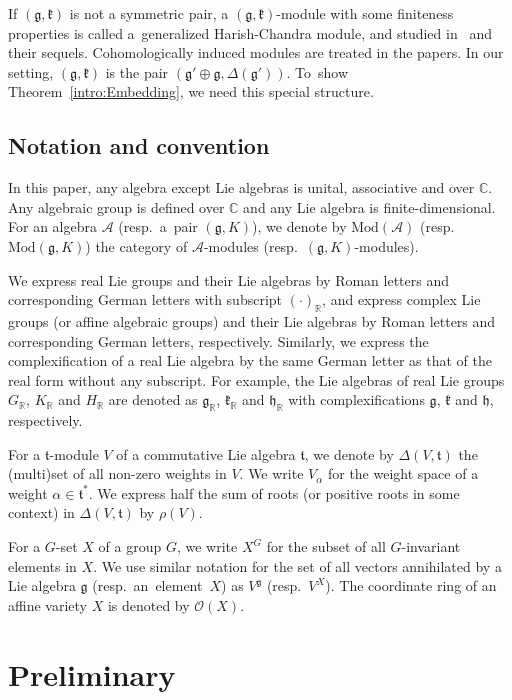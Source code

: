 \documentclass[pdftex]{sigma}
\numberwithin{equation}{section}
\theoremstyle{definition}
\newcommand{\BasicRing}[1]{\mathbb{#1}}
\newcommand{\RR}{\BasicRing{R}}
\newcommand{\CC}{\BasicRing{C}}
\newcommand{\Mod}{\mathrm{Mod}}
\newcommand{\alg}[1]{\mathcal{#1}}
\newcommand{\lie}[1]{\mathfrak{#1}}
\newcommand{\regular}{\mathcal{O}}
\newcommand{\rring}[1]{\regular(#1)}
\newcommand{\rhog}[1]{\rho(#1)}
\begin{document}
If $(\lie{g}, \lie{k})$ is not a symmetric pair, a $(\lie{g}, \lie{k})$-module with some finiteness properties is called a~generalized Harish-Chandra module, and studied in~\cite{PeZu04_generalized_harish_chandra,PeZu04_generalized_harish_chandra2} and their sequels.
Cohomologically induced modules are treated in the papers.
In our setting, $(\lie{g}, \lie{k})$ is the pair $(\lie{g'\oplus g}, \Delta(\lie{g'}))$.
To~show Theorem~\ref{intro:Embedding}, we need this special structure.

\subsection*{Notation and convention}

In this paper, any algebra except Lie algebras is unital, associative and over $\CC$.
Any algebraic group is defined over $\CC$ and any Lie algebra is finite-dimensional.
For an algebra $\alg{A}$ (resp.\ a~pair $(\lie{g}, K)$), we denote by $\Mod(\alg{A})$ (resp.\ $\Mod(\lie{g}, K)$) the category of $\alg{A}$-modules (resp.\ \mbox{$(\lie{g}, K)$-modules}).

We express real Lie groups and their Lie algebras by Roman letters and corresponding German letters with subscript $(\cdot)_\RR$, and express complex Lie groups (or affine algebraic groups) and their Lie algebras by Roman letters and corresponding German letters, respectively.
Similarly, we express the complexification of a real Lie algebra by the same German letter as that of the real form without any subscript.
For example, the Lie algebras of real Lie groups $G_\RR$, $K_\RR$ and $H_\RR$ are denoted as $\lie{g}_\RR$, $\lie{k}_\RR$ and $\lie{h}_\RR$ with complexifications $\lie{g}$, $\lie{k}$ and $\lie{h}$, respectively.

For a $\lie{t}$-module $V$ of a commutative Lie algebra $\lie{t}$, we denote by $\Delta(V, \lie{t})$ the (multi)set of all non-zero weights in $V$.
We write $V_\alpha$ for the weight space of a weight $\alpha \in \lie{t}^*$.
We express half the sum of roots (or positive roots in some context) in $\Delta(V, \lie{t})$ by $\rhog{V}$.

For a $G$-set $X$ of a group $G$, we write $X^G$ for the subset of all $G$-invariant elements in $X$.
We use similar notation for the set of all vectors annihilated by a Lie algebra $\lie{g}$ (resp.\ an~element~$X$) as $V^{\lie{g}}$ \big(resp.\ $V^X$\big).
The coordinate ring of an affine variety $X$ is denoted by $\rring{X}$.


\section{Preliminary}
\end{document}
